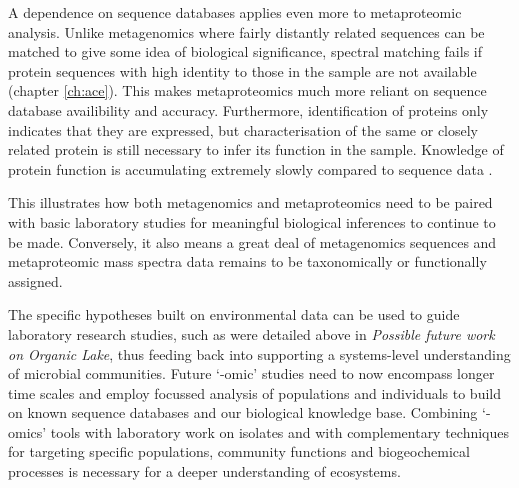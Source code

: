A dependence on sequence databases applies even more to metaproteomic analysis.
Unlike metagenomics where fairly distantly related sequences can be matched to give some idea of biological significance, spectral matching fails if protein sequences with high identity to those in the sample are not available (chapter \ref{ch:ace}).
This makes metaproteomics much more reliant on sequence database availibility and accuracy.
Furthermore, identification of proteins only indicates that they are expressed, but characterisation of the same or closely related protein is still necessary to infer its function in the sample.
Knowledge of protein function is accumulating extremely slowly compared to sequence data .

This illustrates how both metagenomics and metaproteomics need to be paired with basic laboratory studies for meaningful biological inferences to continue to be made.
Conversely, it also means a great deal of metagenomics sequences and metaproteomic mass spectra data remains to be taxonomically or functionally assigned.

The specific hypotheses built on environmental data can be used to guide laboratory research studies, such as were detailed above in \emph{Possible future work on Organic Lake}, thus feeding back into supporting a systems-level understanding of microbial communities.
Future `-omic' studies need to now encompass longer time scales and employ focussed analysis of populations and individuals to build on known sequence databases and our biological knowledge base.
Combining `-omics' tools with laboratory work on isolates and with complementary techniques for targeting specific populations, community functions and biogeochemical processes is necessary for a deeper understanding of ecosystems.

